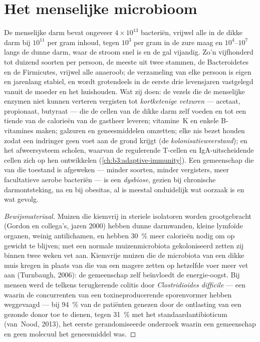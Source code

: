 \section{Het menselijke microbioom}

\begin{definition}[De darmgemeenschap]\label{def:b3:microbiomes:gut}
De menselijke darm bevat ongeveer $4\times 10^{13}$ bacteriën, vrijwel
alle in de dikke darm bij $10^{11}$ per gram inhoud, tegen $10^{3}$ per
gram in de zure maag en $10^{4}$--$10^{7}$ langs de dunne darm, waar de
stroom snel is en de gal vijandig. Zo'n vijfhonderd tot duizend soorten
per persoon, de meeste uit twee stammen, de Bacteroidetes en de
Firmicutes, vrijwel alle anaeroob; de verzameling van elke persoon is
eigen en jarenlang stabiel, en wordt grotendeels in de eerste drie
levensjaren vastgelegd vanuit de moeder en het huishouden. Wat zij
doen: de vezels die de menselijke enzymen niet kunnen verteren
vergisten tot \emph{kortketenige vetzuren} --- acetaat, propionaat,
butyraat --- die de cellen van de dikke darm zelf voeden en tot een
tiende van de calorieën van de gastheer leveren; vitamine~K en enkele
B-vitamines maken; galzuren en geneesmiddelen omzetten; elke nis bezet
houden zodat een indringer geen voet aan de grond krijgt (de
\emph{kolonisatieweerstand}); en het afweersysteem scholen, waarvan de
regulerende T-cellen en IgA-uitscheidende cellen zich op hen
ontwikkelen (\cref{ch:b3:adaptive-immunity}). Een gemeenschap die van
die toestand is afgeweken --- minder soorten, minder vergisters, meer
facultatieve aerobe bacteriën --- is een \emph{dysbiose}, gezien bij
chronische darmontsteking, na  en bij obesitas, al is
meestal onduidelijk wat oorzaak is en wat gevolg.
\end{definition}

\begin{proof}[Bewijsmateriaal]
Muizen die kiemvrij in steriele isolatoren worden grootgebracht (Gordon
en collega's, jaren 2000) hebben dunne darmwanden, kleine lymfoïde
organen, weinig antilichamen, en hebben \qty{30}{\%} meer calorieën
nodig om op gewicht te blijven; met een normale muizenmicrobiota
gekoloniseerd zetten zij binnen twee weken vet aan. Kiemvrije muizen
die de microbiota van een dikke muis kregen in plaats van die van een
magere zetten op hetzelfde voer meer vet aan (Turnbaugh, 2006): de
gemeenschap zelf beïnvloedt de energie-oogst. Bij mensen werd de
telkens terugkerende colitis door \emph{Clostridioides difficile} ---
een  waarin  de concurrenten van een
toxineproducerende sporenvormer hebben weggevaagd --- bij \qty{94}{\%}
van de patiënten genezen door de ontlasting van een gezonde donor toe
te dienen, tegen \qty{31}{\%} met het standaardantibioticum (van~Nood,
2013), het eerste gerandomiseerde onderzoek waarin een gemeenschap en
geen molecuul het geneesmiddel was.
\end{proof}

